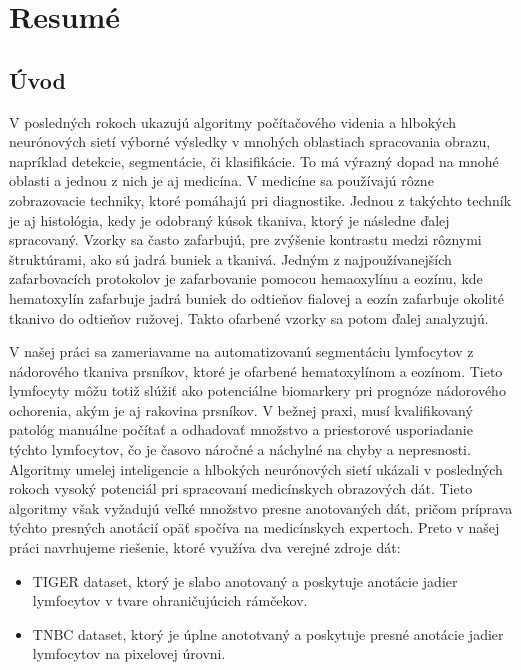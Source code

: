 \chapter{Resumé}

\section{Úvod}
V posledných rokoch ukazujú algoritmy počítačového videnia a hlbokých neurónových sietí výborné výsledky v mnohých oblastiach spracovania obrazu, napríklad detekcie, segmentácie, či klasifikácie. To má výrazný dopad na mnohé oblasti a jednou z nich je aj medicína. V medicíne sa používajú rôzne zobrazovacie techniky, ktoré pomáhajú pri diagnostike. Jednou z takýchto techník je aj histológia, kedy je odobraný kúsok tkaniva, ktorý je následne ďalej spracovaný. Vzorky sa často zafarbujú, pre zvýšenie kontrastu medzi rôznymi štruktúrami, ako sú jadrá buniek a tkanivá. Jedným z najpoužívanejších zafarbovacích protokolov je zafarbovanie pomocou hemaoxylínu a eozínu, kde hematoxylín zafarbuje jadrá buniek do odtieňov fialovej a eozín zafarbuje okolité tkanivo do odtieňov ružovej. Takto ofarbené vzorky sa potom ďalej analyzujú.

V našej práci sa zameriavame na automatizovanú segmentáciu lymfocytov z nádorového tkaniva prsníkov, ktoré je ofarbené hematoxylínom a eozínom. Tieto lymfocyty môžu totiž slúžiť ako potenciálne biomarkery pri prognóze nádorového ochorenia, akým je aj rakovina prsníkov. V bežnej praxi, musí kvalifikovaný patológ manuálne počítať a odhadovať množstvo a priestorové usporiadanie týchto lymfocytov, čo je časovo náročné a náchylné na chyby a nepresnosti. Algoritmy umelej inteligencie a hlbokých neurónových sietí ukázali v posledných rokoch vysoký potenciál pri spracovaní medicínskych obrazových dát. Tieto algoritmy však vyžadujú veľké množstvo presne anotovaných dát, pričom príprava týchto presných anotácií opäť spočíva na medicínskych expertoch. Preto v našej práci navrhujeme riešenie, ktoré využíva dva verejné zdroje dát:

\begin{itemize}
    \item TIGER dataset, ktorý je slabo anotovaný a poskytuje anotácie jadier lymfocytov v tvare ohraničujúcich rámčekov.
    \item TNBC dataset, ktorý je úplne anototvaný a poskytuje presné anotácie jadier lymfocytov na pixelovej úrovni.
\end{itemize}

